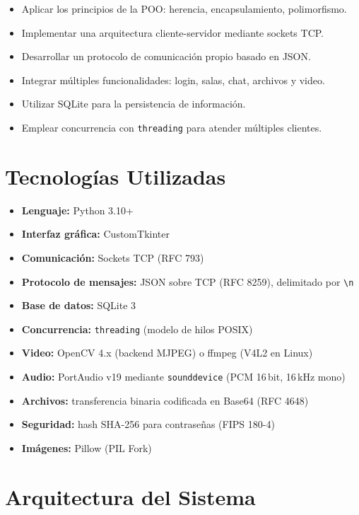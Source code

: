 \documentclass[12pt,a4paper]{article}
\begin{document}
\begin{itemize}
    \item Aplicar los principios de la POO: herencia, encapsulamiento, polimorfismo.
    \item Implementar una arquitectura cliente-servidor mediante sockets TCP.
    \item Desarrollar un protocolo de comunicaci\'on propio basado en JSON.
    \item Integrar m\'ultiples funcionalidades: login, salas, chat, archivos y video.
    \item Utilizar SQLite para la persistencia de informaci\'on.
    \item Emplear concurrencia con \texttt{threading} para atender m\'ultiples clientes.
\end{itemize}

\section{Tecnolog\'ias Utilizadas}

\begin{itemize}
    \item \textbf{Lenguaje:} Python 3.10+
    \item \textbf{Interfaz gr\'afica:} CustomTkinter
    \item \textbf{Comunicaci\'on:} Sockets TCP (RFC 793)
    \item \textbf{Protocolo de mensajes:} JSON sobre TCP (RFC 8259), delimitado por \verb|\n|
    \item \textbf{Base de datos:} SQLite 3
    \item \textbf{Concurrencia:} \texttt{threading} (modelo de hilos POSIX)
    \item \textbf{Video:} OpenCV 4.x (backend MJPEG) o ffmpeg (V4L2 en Linux)
    \item \textbf{Audio:} PortAudio v19 mediante \texttt{sounddevice} (PCM 16\,bit, 16\,kHz mono)
    \item \textbf{Archivos:} transferencia binaria codificada en Base64 (RFC 4648)
    \item \textbf{Seguridad:} hash SHA-256 para contrase\~nas (FIPS 180-4)
    \item \textbf{Im\'agenes:} Pillow (PIL Fork)
\end{itemize}

\section{Arquitectura del Sistema}
\end{document}
